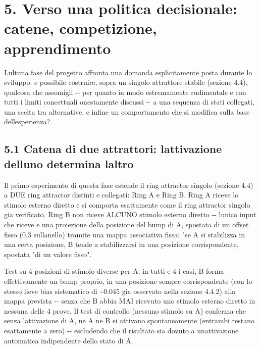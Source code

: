 \documentclass[
  italian,
]{article}
\begin{document}
\section{5. Verso una politica decisionale: catene, competizione, apprendimento}\label{verso-una-politica-decisionale-catene-competizione-apprendimento}

L\textquotesingle ultima fase del progetto affronta una domanda esplicitamente posta durante lo sviluppo: e\textquotesingle{} possibile costruire, sopra un singolo attrattore stabile (sezione 4.4), qualcosa che assomigli -\/- per quanto in modo estremamente rudimentale e con tutti i limiti concettuali onestamente discussi -\/- a una sequenza di stati collegati, una scelta tra alternative, e infine un comportamento che si modifica sulla base dell\textquotesingle esperienza?

\subsection{5.1 Catena di due attrattori: l\textquotesingle attivazione dell\textquotesingle uno determina l\textquotesingle altro}\label{catena-di-due-attrattori-lattivazione-delluno-determina-laltro}

Il primo esperimento di questa fase estende il ring attractor singolo (sezione 4.4) a DUE ring attractor distinti e collegati: Ring A e Ring B. Ring A riceve lo stimolo esterno diretto e si comporta esattamente come il ring attractor singolo gia\textquotesingle{} verificato. Ring B non riceve ALCUNO stimolo esterno diretto -\/- l\textquotesingle unico input che riceve e\textquotesingle{} una proiezione della posizione del bump di A, spostata di un offset fisso (0.3 sull\textquotesingle anello) tramite una mappa associativa fissa: "se A si stabilizza in una certa posizione, B tende a stabilizzarsi in una posizione corrispondente, spostata "di un valore fisso".

Test su 4 posizioni di stimolo diverse per A: in tutti e 4 i casi, B forma effettivamente un bump proprio, in una posizione sempre corrispondente (con lo stesso lieve bias sistematico di \textasciitilde0.045 gia\textquotesingle{} osservato nella sezione 4.4.2) alla mappa prevista -\/- senza che B abbia MAI ricevuto uno stimolo esterno diretto in nessuna delle 4 prove. Il test di controllo (nessuno stimolo su A) conferma che senza l\textquotesingle attivazione di A, ne\textquotesingle{} A ne\textquotesingle{} B si attivano spontaneamente (entrambi restano esattamente a zero) -\/- escludendo che il risultato sia dovuto a un\textquotesingle attivazione automatica indipendente dello stato di A.
\end{document}
